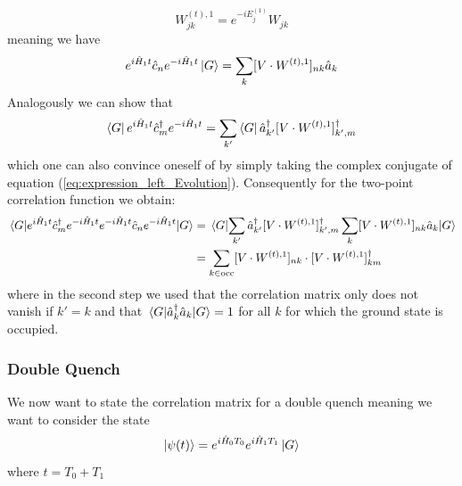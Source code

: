 \documentclass[11pt, a4paper]{article}
\theoremstyle{definition} %
\begin{document}
	\begin{equation}
		W_{jk}^{(t),1} = e^{-i E_j^{(1)}} W_{jk}
	\end{equation}
	meaning we have
	\begin{equation}
		e^{i \hat{H}_1 t} \hat{c}_n  e^{-i \hat{H}_1 t} \ket{G} = \sum_k [ V\cdot W^{(t), 1}]_{nk} \hat{a}_k
		\label{eq:expression_left_Evolution}
	\end{equation}
	Analogously we can show that
	\begin{equation}
		\bra{G} e^{i \hat{H}_1 t} \hat{c}_m^\dagger e^{-i \hat{H}_1 t} = \sum_{k'}\bra{G} \hat{a}_{k'}^\dagger [V \cdot W^{(t), 1} ]^\dagger_{k',m}
	\end{equation}
	which one can also convince oneself of by simply taking the complex conjugate of equation (\ref{eq:expression_left_Evolution}). Consequently for the two-point correlation function we obtain:
	\begin{equation}
	\begin{split}
	\mel{G}{e^{i \hat{H}_1 t} \hat{c}_m^\dagger e^{-i\hat{H}_1 t} e^{-i \hat{H}_1 t} \hat{c}_n e^{-i \hat{H}_1 t}}{G} &= \mel {G}{\sum_{k'}\hat{a}_{k'}^\dagger [ V \cdot W^{(t),1}]_{k',m}^\dagger \sum_k [V \cdot W^{(t),1 } ]_{nk} \hat{a}_k}{G}\\
	&= \sum_{k \in \text{occ}} [ V \cdot W^{(t),1} ]_{nk} \cdot [V\cdot W^{(t),1} ]_{km}^\dagger
	\end{split}
	\end{equation}
	where in the second step we used that the correlation matrix only does not vanish if $k' = k$ and that $\mel{G}{\hat{a}_k^\dagger \hat{a}_k}{G} = 1$ for all $k$ for which the ground state is occupied.
	
	\subsubsection{Double Quench}
	We now want to state the correlation matrix for a double quench meaning we want to consider the state
	\begin{equation}
		\ket{\psi(t)} = e^{i \hat{H}_0 T_0} e^{i \hat{H}_1 T_1} \ket{G}
	\end{equation}
	where $t = T_0 + T_1$
	
\end{document}
